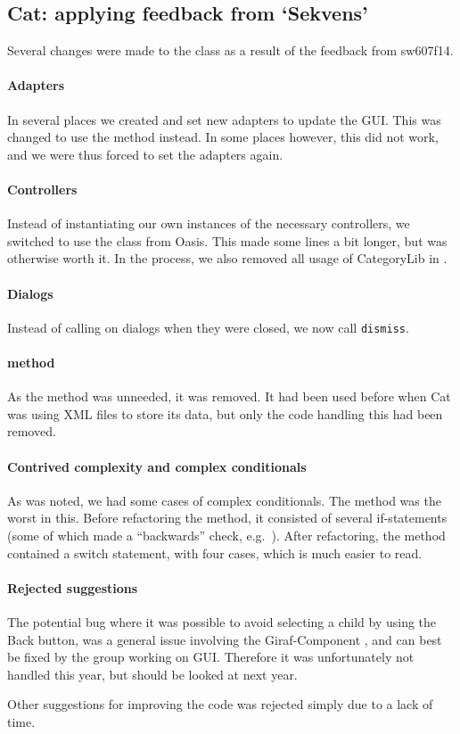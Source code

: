 \subsection{Cat: applying feedback from `Sekvens'}\label{subsec:collab_catresult}
Several changes were made to the class  as a result of the feedback from sw607f14.

\paragraph{Adapters}
In several places we created and set new adapters to update the GUI. This was changed to use the  method instead. In some places however, this did not work, and we were thus forced to set the adapters again.

\paragraph{Controllers}
Instead of instantiating our own instances of the necessary controllers, we switched to use the  class from Oasis. This made some lines a bit longer, but was otherwise worth it. In the process, we also removed all usage of CategoryLib in .

\paragraph{Dialogs}
Instead of calling  on dialogs when they were closed, we now call \texttt{dismiss}.

\paragraph{ method}
As the  method was unneeded, it was removed. It had been used before when Cat was using XML files to store its data, but only the code handling this had been removed.

\paragraph{Contrived complexity and complex conditionals}
As was noted, we had some cases of complex conditionals. The  method was the worst in this. Before refactoring the method, it consisted of several if-statements (some of which made a ``backwards'' check, e.g.\ ). After refactoring, the method contained a switch statement, with four cases, which is much easier to read.

\paragraph{Rejected suggestions}
The potential bug where it was possible to avoid selecting a child by using the Back button, was a general issue involving the Giraf-Component , and can best be fixed by the group working on GUI. Therefore it was unfortunately not handled this year, but should be looked at next year.

Other suggestions for improving the code was rejected simply due to a lack of time.